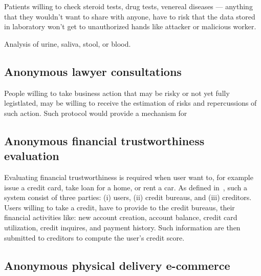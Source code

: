 \documentclass{article}
\begin{document}
Patients willing to check steroid tests, drug tests, venereal diseases — anything that they wouldn't want to share with anyone, have to risk that the data stored in laboratory won't get to unauthorized hands like attacker or malicious worker.

Analysis of urine, saliva, stool, or blood. 

\subsection{Anonymous lawyer consultations}

People willing to take business action that may be risky or not yet fully legistlated, may be willing to receive the estimation of risks and repercussions of such action.
Such protocol would provide a mechanism for 


\subsection{Anonymous financial trustworthiness evaluation}

Evaluating financial trustworthiness is required when user want to, for example issue a credit card, take loan for a home, or rent a car. 
As defined in~\cite{lin2021efficient}, such a system consist of three parties: (i) users, (ii) credit bureaus, and (iii) creditors. Users willing to take a credit, have to provide to the credit bureaus, their financial activities like: new account creation, account balance, credit card utilization, credit inquires, and payment history. Such information are then submitted to creditors to compute the user's credit score. 

\subsection{Anonymous physical delivery e-commerce}
~\cite{birjoveanu2015anonymity}
\end{document}
